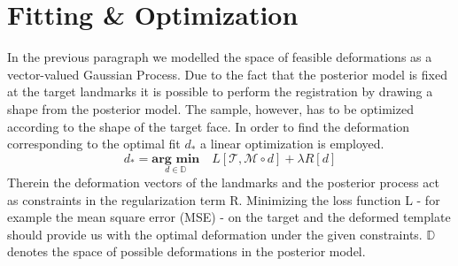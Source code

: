\section{Fitting \& Optimization}
\label{optimization}
In the previous paragraph we modelled the space of feasible deformations as a vector-valued Gaussian Process. Due to the fact that the posterior model is fixed at the target landmarks it is possible to perform the registration by drawing a shape from the posterior model. The sample, however, has to be optimized according to the shape of the target face. 
In order to find the deformation corresponding to the optimal fit $d_{*}$ a linear optimization is employed. \begin{equation}
    d_{*} = \underset{d \in \mathbb{D}}{\textbf{arg min}}\quad L[\mathcal{T}, \mathcal{M }\circ d]+\lambda R[d]
\end{equation}
Therein the deformation vectors of the landmarks and the posterior process act as constraints in the regularization term R. Minimizing the loss function L - for example the mean square error (MSE) - on the target and the deformed template should provide us with the optimal deformation under the given constraints. $\mathbb{D}$ denotes the space of possible deformations in the posterior model.\\ 

